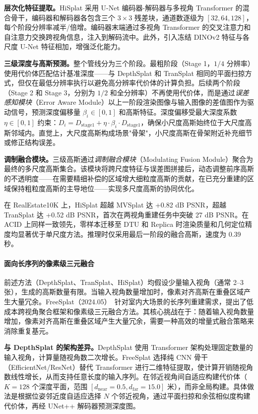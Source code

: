\textbf{层次化特征提取。}HiSplat 采用 U-Net 编码器-解码器与多视角 Transformer 的混合骨干，编码器和解码器各包含三个 $3{\times}3$ 残差块，通道数逐级为 $[32, 64, 128]$，每个阶段分辨率减半/倍增。编码器末端通过多视角 Transformer 的交叉注意力和自注意力交换跨视角信息，注入到解码流中。此外，引入冻结 DINOv2 特征与各尺度 U-Net 特征相加，增强泛化能力。

\textbf{三级深度与高斯预测。}整个管线分为三个阶段。最粗阶段（Stage 1，$1/4$ 分辨率）使用代价体匹配估计基准深度——与 DepthSplat 和 TranSplat 相同的平面扫掠方式，但仅在最低分辨率执行以避免高分辨率代价体的计算负担。后续两个阶段（Stage 2 和 Stage 3，分别为 $1/2$ 和全分辨率）不再使用代价体，而是通过\emph{误差感知模块}（Error Aware Module）以上一阶段渲染图像与输入图像的差值图作为驱动信号，预测深度偏移量 $\beta_i \in [0,1]$ 和高斯特征。深度偏移受最大深度系数 $\eta \in [0,1]$ 约束：$D_i = D_{\text{stage1}} + \eta \cdot \beta_i \cdot D_{\text{stage1}}$，确保小尺度高斯始终位于大尺度高斯邻域内。直觉上，大尺度高斯构成场景"骨架"，小尺度高斯在骨架附近补充细节或修正结构误差。

\textbf{调制融合模块。}三级高斯通过\emph{调制融合模块}（Modulating Fusion Module）聚合为最终的多尺度高斯集合。该模块将跨尺度特征与误差图拼接后，动态调整前序高斯的不透明度——在需要精细补偿的区域增大细粒度高斯的贡献，在已充分重建的区域保持粗粒度高斯的主导地位——实现多尺度高斯的协同优化。

在 RealEstate10K 上，HiSplat 超越 MVSplat 达 +0.82 dB PSNR，超越 TranSplat 达 +0.52 dB PSNR，首次在两视角重建任务中突破 27 dB PSNR。在 ACID 上同样一致领先，零样本迁移至 DTU 和 Replica 时渲染质量和几何定位精度均显著优于单尺度方法。推理时仅采用最后一阶段的融合高斯，速度为 0.39 秒。

\paragraph{面向长序列的像素级三元融合}

前述方法（DepthSplat、TranSplat、HiSplat）均假设少量输入视角（通常 2--3 张），生成的高斯数量有限。当输入视角数量增加时，像素对齐高斯在重叠区域产生大量冗余。FreeSplat（2024.05）~\cite{2405_17958}针对室内大场景的长序列重建需求，提出了低成本跨视角聚合框架和像素级三元融合方法。其核心挑战在于：随着输入视角数量增加，像素对齐高斯在重叠区域产生大量冗余，需要一种高效的增量式融合策略来消除重复基元。

\textbf{与 DepthSplat 的架构差异。}DepthSplat 使用 Transformer 架构处理固定数量的输入视角，计算量随视角数二次增长。FreeSplat 选择纯 CNN 骨干（EfficientNet/ResNet）替代 Transformer 进行二维特征提取，使计算开销随视角数线性增长，从而支持任意长度的输入序列。在邻近视角间自适应构建代价体（$K{=}128$ 个深度平面，范围 $[d_{\text{near}}{=}0.5, d_{\text{far}}{=}15.0]$ 米），而非全局构建。具体做法是根据位姿邻近度自适应选择 $N$ 个邻近视角，通过平面扫掠和余弦相似度构建代价体，再经 UNet++ 解码器预测深度图。

